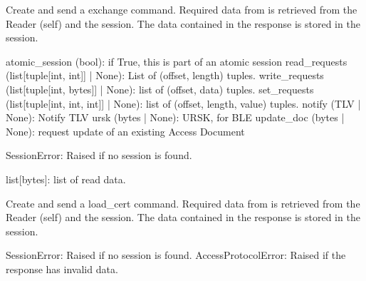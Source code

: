 \documentclass[letterpaper,10pt,english]{sphinxmanual}
\begin{document}
\begin{fulllineitems}
\begin{fulllineitems}
\sphinxAtStartPar
Create and send a exchange command.
Required data from is retrieved from the Reader (self) and the session.
The data contained in the response is stored in the session.
\begin{description}
\sphinxAtStartPar
atomic\_session (bool): if True, this is part of an atomic session
read\_requests (list{[}tuple{[}int, int{]}{]} | None): List of (offset, length) tuples.
write\_requests (list{[}tuple{[}int, bytes{]}{]} | None): list of (offset, data) tuples.
set\_requests (list{[}tuple{[}int, int, int{]}{]} | None): list of (offset, length, value) tuples.
notify (TLV | None): Notify TLV
ursk (bytes | None): URSK, for BLE
update\_doc (bytes | None): request update of an existing Access Document

\sphinxAtStartPar
SessionError: Raised if no session is found.

\sphinxAtStartPar
list{[}bytes{]}: list of read data.

\end{description}

\end{fulllineitems}


\begin{fulllineitems}
\label{\detokenize{aliro_actuator.access_protocol.reader:aliro_actuator.access_protocol.reader.Reader.handle_load_cert}}
\pysigstartsignatures
{}
\pysigstopsignatures
\sphinxAtStartPar
Create and send a load\_cert command.
Required data from is retrieved from the Reader (self) and the session.
The data contained in the response is stored in the session.
\begin{description}
\sphinxAtStartPar
SessionError: Raised if no session is found.
AccessProtocolError: Raised if the response has invalid data.

\end{description}

\end{fulllineitems}



\end{fulllineitems}
\end{document}
